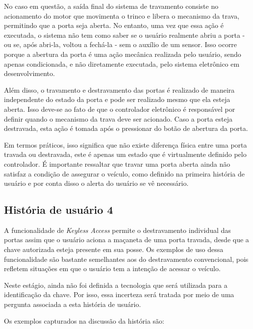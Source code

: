 No caso em questão, a saída final do sistema de travamento consiste no acionamento do motor que movimenta o trinco e libera o mecanismo da trava, permitindo 
que a porta seja aberta. No entanto, uma vez que essa ação é executada, o sistema não tem como saber se o usuário realmente abriu a porta - ou se, após abri-la, 
voltou a fechá-la - sem o auxílio de um sensor. Isso ocorre porque a abertura da porta é uma ação mecânica realizada pelo usuário, sendo apenas condicionada, e 
não diretamente executada, pelo sistema eletrônico em desenvolvimento.

Além disso, o travamento e destravamento das portas é realizado de maneira independente do estado da porta e pode ser realizado mesmo que ela esteja aberta. Isso 
deve-se ao fato de que o controlador eletrônico é responsável por definir quando o mecanismo da trava deve ser acionado. Caso a porta esteja destravada, esta ação 
é tomada após o pressionar do botão de abertura da porta.

Em termos práticos, isso significa que não existe diferença física entre uma porta travada ou destravada, este é apenas um estado que é virtualmente definido 
pelo controlador. É importante ressaltar que travar uma porta aberta ainda não satisfaz a condição de assegurar o veículo, como definido na primeira história 
de usuário e por conta disso o alerta do usuário se vê necessário.

\subsection{História de usuário 4}

A funcionalidade de \textit{Keyless Access} permite o destravamento individual das portas assim que o usuário aciona a maçaneta de uma porta travada, desde que a chave 
autorizada esteja presente em sua posse. Os exemplos de uso dessa funcionalidade são bastante semelhantes aos do destravamento convencional, pois refletem 
situações em que o usuário tem a intenção de acessar o veículo. 

Neste estágio, ainda não foi definida a tecnologia que será utilizada para a identificação da chave. Por isso, essa incerteza será tratada por meio de uma 
pergunta associada a esta história de usuário.

Os exemplos capturados na discussão da história são:

